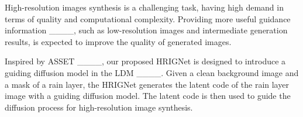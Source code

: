 High-resolution images synthesis is a challenging task, having high demand in terms of quality and computational complexity. Providing more useful guidance information ____, such as low-resolution images and intermediate generation results, is expected to improve the quality of generated images.

Inspired by ASSET ____, our proposed HRIGNet is designed to introduce a guiding diffusion model in the LDM ____. Given a clean background image and a mask of a rain layer, the HRIGNet generates the latent code of the rain layer image with a guiding diffusion model. The latent code is then used to guide the diffusion process for high-resolution image synthesis.